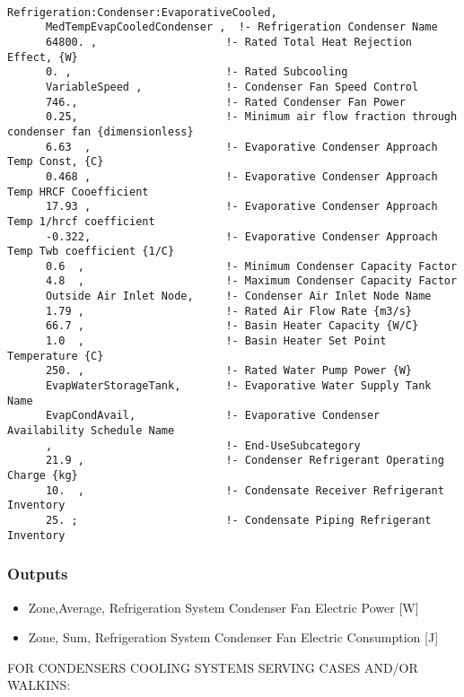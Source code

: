 \begin{lstlisting}

Refrigeration:Condenser:EvaporativeCooled,
      MedTempEvapCooledCondenser ,  !- Refrigeration Condenser Name
      64800. ,                    !- Rated Total Heat Rejection Effect, {W}
      0. ,                        !- Rated Subcooling
      VariableSpeed ,             !- Condenser Fan Speed Control
      746.,                       !- Rated Condenser Fan Power
      0.25,                       !- Minimum air flow fraction through condenser fan {dimensionless}
      6.63  ,                     !- Evaporative Condenser Approach Temp Const, {C}
      0.468 ,                     !- Evaporative Condenser Approach Temp HRCF Cooefficient
      17.93 ,                     !- Evaporative Condenser Approach Temp 1/hrcf coefficient
      -0.322,                     !- Evaporative Condenser Approach Temp Twb coefficient {1/C}
      0.6  ,                      !- Minimum Condenser Capacity Factor
      4.8  ,                      !- Maximum Condenser Capacity Factor
      Outside Air Inlet Node,     !- Condenser Air Inlet Node Name
      1.79 ,                      !- Rated Air Flow Rate {m3/s}
      66.7 ,                      !- Basin Heater Capacity {W/C}
      1.0  ,                      !- Basin Heater Set Point Temperature {C}
      250. ,                      !- Rated Water Pump Power {W}
      EvapWaterStorageTank,       !- Evaporative Water Supply Tank Name
      EvapCondAvail,              !- Evaporative Condenser Availability Schedule Name
      ,                           !- End-UseSubcategory
      21.9 ,                      !- Condenser Refrigerant Operating Charge {kg}
      10.  ,                      !- Condensate Receiver Refrigerant Inventory
      25. ;                       !- Condensate Piping Refrigerant Inventory
\end{lstlisting}

\subsubsection{Outputs}\label{outputs-7-008}

\begin{itemize}
\item
  Zone,Average, Refrigeration System Condenser Fan Electric Power {[}W{]}
\item
  Zone, Sum, Refrigeration System Condenser Fan Electric Consumption {[}J{]}
\end{itemize}

FOR CONDENSERS COOLING SYSTEMS SERVING CASES AND/OR WALKINS:

